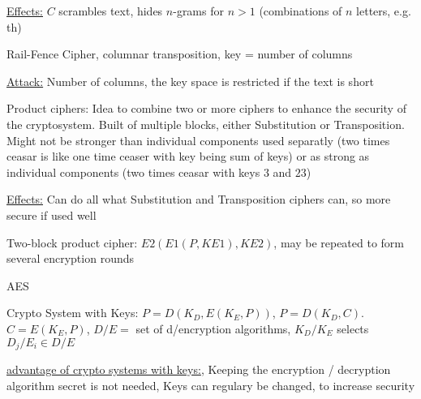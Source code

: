 \documentclass[landscape, a4paper]{article}
\begin{document}
\begin{minipage}[t]{0.2\linewidth}
\begin{betterlist}
\begin{betterlist}
			\item \underline{Effects:} $C$ scrambles text, hides \alert{$n$-grams} for $n > 1$ (combinations of $n$ letters, e.g. th)
		\end{betterlist}
		\begin{betterlist}
			\item \alert{Rail-Fence Cipher}, columnar transposition, \alert{key} = number of columns
			\begin{betterlist}
				\item \underline{Attack:} Number of columns, the key space is restricted if the text is short
			\end{betterlist}
		\end{betterlist}
	\end{betterlist}
	\begin{betterlist}
		\item \alert{Product ciphers:} Idea to combine two or more ciphers to enhance the security of the cryptosystem. Built of multiple blocks, either \alert{Substitution} or \alert{Transposition}. Might not be stronger than individual components used separatly (two times ceasar is like one time ceaser with key being sum of keys) or as strong as individual components (two times ceasar with keys $3$ and $23$)
		\begin{betterlist}
			\item \underline{Effects:} Can do all what Substitution and Transposition ciphers can, so more secure if used well
			\item \alert{Two-block product cipher:} $E2(E1(P, KE1), KE2)$, may be repeated to form several encryption rounds
			\item \alert{AES}
		\end{betterlist}
	\end{betterlist}
	\fbox{Classification by key}
	\begin{betterlist}
		\item \alert{Crypto System with Keys:} $P = D(K_D, E(K_E, P))$, $P = D(K_D, C)$. $C = E(K_E, P)$, $D/E =$ set of d/encryption algorithms, $K_D/K_E$ selects $D_j/E_i \in D/E$
		\begin{betterlist}
			\item \underline{advantage of crypto systems with keys:}, Keeping the encryption / decryption algorithm secret is not needed, Keys can regulary be changed, to increase security
		\end{betterlist}
	\end{betterlist}

\end{minipage}
\end{document}
